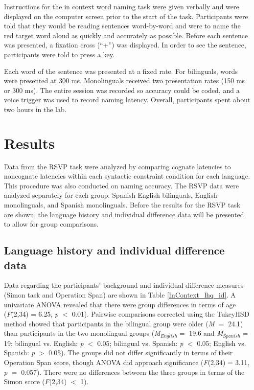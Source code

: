 Instructions for the in context word naming task were given  verbally and were displayed on the computer screen prior to the start of the task. Participants were told that they would be reading sentences word-by-word and were to name the red target word aloud as quickly and accurately as possible. Before each sentence was presented, a fixation cross (``+'') was displayed. In order to see the sentence, participants were told to press a key. 

Each word of the sentence was presented at a fixed rate. For bilinguals, words were presented at 300 ms. Monolinguals received two presentation rates (150 ms or 300 ms). The entire session was recorded so accuracy could be coded, and a voice trigger was used to record naming latency. Overall, participants spent about two hours in the lab. 

\section{Results}
Data from the RSVP  task were analyzed by comparing cognate latencies to noncognate latencies within each syntactic constraint condition for each language. This procedure was also conducted on naming accuracy. The RSVP data were analyzed separately for each group: Spanish-English bilinguals, English monolinguals, and Spanish monolinguals. Before the results for the RSVP task are shown, the language history and individual difference data will be presented to allow for group comparisons. 

\subsection{Language history and individual difference data}
Data regarding the participants' background and individual difference measures (Simon task and Operation Span) are shown in Table \ref{InContext_lhq_id}. A univariate ANOVA revealed that there were group differences in terms of  age (\textit{F}(2,34) = 6.25, \textit{p} $<$ 0.01). Pairwise comparisons corrected using the TukeyHSD method showed that participants in the bilingual group were older  (\textit{M} $=$ 24.1) than participants in the two monolingual groups (\textit{M}$_{English} =$ 19.6 and \textit{M}$_{Spanish} =$ 19; bilingual vs. English: \textit{p} $<$ 0.05; bilingual vs. Spanish: \textit{p} $<$ 0.05; English vs. Spanish: \textit{p} $>$ 0.05). The groups did not differ significantly  in terms of their Operation Span score, though ANOVA did approach significance (\textit{F}(2,34) = 3.11, \textit{p} $=$ 0.057).  There were no differences between the three groups in terms of the Simon score (\textit{F}(2,34) $<$ 1). 

